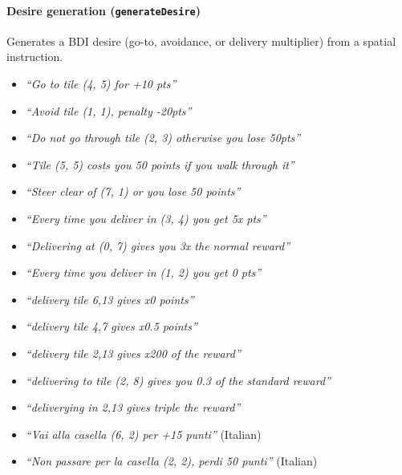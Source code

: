 \paragraph{Desire generation (\texttt{generateDesire})}
Generates a BDI desire (go-to, avoidance, or delivery multiplier) from a spatial instruction.
\begin{itemize}
  \item \textit{``Go to tile (4, 5) for +10 pts''}
  \item \textit{``Avoid tile (1, 1), penalty -20pts''}
  \item \textit{``Do not go through tile (2, 3) otherwise you lose 50pts''}
  \item \textit{``Tile (5, 5) costs you 50 points if you walk through it''}
  \item \textit{``Steer clear of (7, 1) or you lose 50 points''}
  \item \textit{``Every time you deliver in (3, 4) you get 5x pts''}
  \item \textit{``Delivering at (0, 7) gives you 3x the normal reward''}
  \item \textit{``Every time you deliver in (1, 2) you get 0 pts''}
  \item \textit{``delivery tile 6,13 gives x0 points''}
  \item \textit{``delivery tile 4,7 gives x0.5 points''}
  \item \textit{``delivery tile 2,13 gives x200 of the reward''}
  \item \textit{``delivering to tile (2, 8) gives you 0.3 of the standard reward''}
  \item \textit{``deliverying in 2,13 gives triple the reward''}
  \item \textit{``Vai alla casella (6, 2) per +15 punti''} \quad (Italian)
  \item \textit{``Non passare per la casella (2, 2), perdi 50 punti''} \quad (Italian)
\end{itemize}

